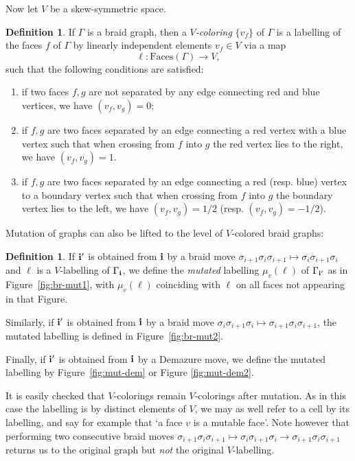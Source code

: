 \documentclass[11pt, reqno]{amsart}
\theoremstyle{definition}
\newtheorem{defn}[theorem]{Definition}
\numberwithin{equation}{section}
\begin{document}
Now let $V$ be a skew-symmetric space. 
\begin{defn}
If $\Gamma$ is a braid graph, then a \emph{$V$-coloring} $\{v_f\}$ of $\Gamma$ is a labelling of the faces $f$ of $\Gamma$ by linearly independent elements $v_f\in V$ via a map 
\begin{equation}
\ell \colon \mathrm{Faces}(\Gamma)\rightarrow V,
\end{equation} 
such that the following conditions are satisfied:
\begin{enumerate}
\item if two faces $f,g$ are not separated by any edge connecting red and blue vertices, we have $(v_f,v_g)=0$;
\item if $f,g$ are two faces separated by an edge  connecting a red vertex with a blue vertex such that when crossing from $f$ into $g$ the red vertex lies to the right, we have $(v_f,v_g)=1$.
\item if $f,g$ are two faces separated by an edge connecting a red (resp. blue) vertex  to a boundary vertex  such that when crossing from $f$ into $g$ the boundary vertex lies to the left, we have $(v_f,v_g)=1/2$ (resp. $(v_f,v_g)=-1/2$).
\end{enumerate}
\end{defn}

Mutation of graphs can also be lifted to the level of $V$-colored braid graphs: 
\begin{defn}
If $\bf i'$ is obtained from $\bf i$ by a braid move $\sigma_{i+1}\sigma_{i}\sigma_{i+1}\mapsto\sigma_{i}\sigma_{i+1}\sigma_{i}$ and $\ell$ is a $V$-labelling of $\Gamma_{\bf i}$, we define the \emph{mutated} labelling $\mu_v(\ell)$ of $\Gamma_{\bf i'}$ as in Figure~\ref{fig:br-mut1}, with $\mu_v(\ell)$ coinciding with $\ell$ on all faces not appearing in that Figure.  

Similarly, if $\bf i'$ is obtained from $\bf i$ by a braid move $\sigma_{i}\sigma_{i+1}\sigma_{i}\mapsto\sigma_{i+1}\sigma_{i}\sigma_{i+1}$, the mutated labelling is defined in  Figure~\ref{fig:br-mut2}. 

Finally, if $\bf i'$ is obtained from $\bf i$ by a Demazure move, we define the mutated labelling by Figure~\ref{fig:mut-dem} or Figure \ref{fig:mut-dem2}. 
\end{defn}

It is easily checked that $V$-colorings remain $V$-colorings after mutation. As in this case the labelling is by distinct elements of $V$, we may as well refer to a cell by its labelling, and say for example that `a face $v$ is a mutable face'. Note however that performing two consecutive braid moves  $\sigma_{i+1}\sigma_{i}\sigma_{i+1}\mapsto \sigma_{i}\sigma_{i+1}\sigma_{i}\rightarrow\sigma_{i+1}\sigma_{i}\sigma_{i+1}$ returns us to the original graph but \emph{not} the original $V$-labelling.
\end{document}
